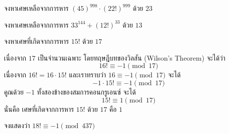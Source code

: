 \begin{examplebox}
	จงหาเศษเหลือจากการหาร $(45)^{998}\cdot (22!)^{999}$ ด้วย $23$
\end{examplebox}
\solution

\newpage
\begin{examplebox}
	จงหาเศษเหลือจากการหาร $33^{144}+(12!)^{33}$ ด้วย $13$
\end{examplebox}
\solution
\newpage
\begin{examplebox}
	จงหาเศษที่เกิดจากการหาร $15!$ ด้วย $17$ 
\end{examplebox}
	\solution เนื่องจาก $17$ เป็นจำนวนเฉพาะ โดยทฤษฎีบทของวิลสัน (Wilson's Theorem) จะได้ว่า
\[ 16! \equiv -1 \pmod{17} \]
เนื่องจาก $16! = 16 \cdot 15!$ และเราทราบว่า $16 \equiv -1 \pmod{17}$ จะได้
\[ -1 \cdot 15! \equiv -1 \pmod{17} \]
คูณด้วย $-1$ ทั้งสองข้างของสมการคอนกรูเอนซ์ จะได้
\[ 15! \equiv 1 \pmod{17} \]
นั่นคือ เศษที่เกิดจากการหาร $15!$ ด้วย $17$ คือ $1$

\begin{examplebox}
	จงแสดงว่า $18! \equiv -1 \pmod{437}$ 
\end{examplebox}
\solution
\newpage
